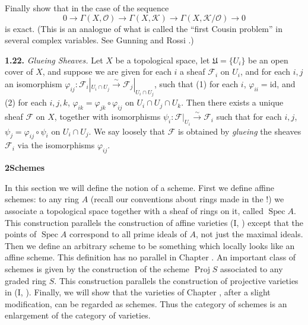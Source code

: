 {{\noindent\hypertarget{ex-II-1.21e}{}Finally show that in the case of  the sequence
\[
0\to\Gamma(X,\mathcal O)\to\Gamma(X,\mathcal K)\to\Gamma(X,\mathcal K/\mathcal O)\to0
\]
is exact. (This is an analogue of what is called the \textquotedblleft{}first Cousin problem\textquotedblright{} in several complex variables. See Gunning and Rossi .)\par}

\smallskip
\noindent\hypertarget{ex-II-1.22}{}\textbf{1.22.} \emph{Glueing Sheaves.} Let $X$ be a topological space, let $\mathfrak U=\{U_i\}$ be an open cover of $X$, and suppose we are given for each $i$ a sheaf $\mathcal F_i$ on $U_i$, and for each $i,j$ an isomorphism $\varphi_{ij}\colon\mathcal F_i|_{U_i\cap U_j}\xrightarrow{\sim}\mathcal F_j|_{U_i\cap U_j}$, such that (1) for each $i$, $\varphi_{ii}=\mathrm{id}$, and (2) for each $i,j,k$, $\varphi_{ik}=\varphi_{jk}\circ\varphi_{ij}$ on $U_i\cap U_j\cap U_k$. Then there exists a unique sheaf $\mathcal F$ on $X$, together with isomorphisms $\psi_i\colon\mathcal F|_{U_i}\xrightarrow{\sim}\mathcal F_i$ such that for each $i,j$, $\psi_j=\varphi_{ij}\circ\psi_i$ on $U_i\cap U_j$. We say loosely that $\mathcal F$ is obtained by \emph{glueing} the sheaves $\mathcal F_i$ via the isomorphisms $\varphi_{ij}$.

\vspace{19pt}
\noindent\hypertarget{sec-II-2}{}{\large\bfseries 2\quad Schemes}\par\nobreak\vspace{8pt}
\noindent In this section we will define the notion of a scheme. First we define affine schemes: to any ring $A$ (recall our conventions about rings made in the !) we associate a topological space together with a sheaf of rings on it, called $\operatorname{Spec}A$. This construction parallels the construction of affine varieties (I, ) except that the points of $\operatorname{Spec}A$ correspond to all prime ideals of $A$, not just the maximal ideals. Then we define an arbitrary scheme to be something which locally looks like an affine scheme. This definition has no parallel in Chapter . An important class of schemes is given by the construction of the scheme $\operatorname{Proj}S$ associated to any graded ring $S$. This construction parallels the construction of projective varieties in (I, ). Finally, we will show that the varieties of Chapter , after a slight modification, can be regarded as schemes. Thus the category of schemes is an enlargement of the category of varieties.
}
